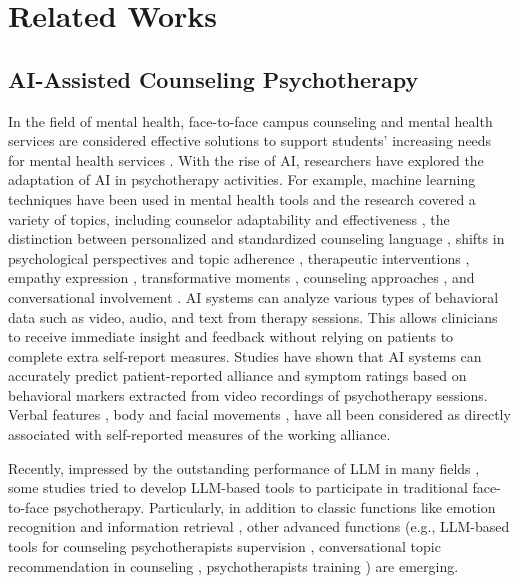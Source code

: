 \section{Related Works}
\subsection{AI-Assisted Counseling Psychotherapy}
In the field of mental health, face-to-face campus counseling and mental health services are considered effective solutions to support students' increasing needs for mental health services \citep{zabek2023roles}. With the rise of AI, researchers have explored the adaptation of AI in psychotherapy activities. For example, machine learning techniques have been used in mental health tools and the research covered a variety of topics, including counselor adaptability and effectiveness \citep{perez2019makes}, the distinction between personalized and standardized counseling language \citep{althoff2016large}, shifts in psychological perspectives and topic adherence \citep{althoff2016large,wadden2021effect}, therapeutic interventions \citep{lee2019identifying}, empathy expression \citep{sharma2020computational}, transformative moments \citep{pruksachatkun2019moments}, counseling approaches \citep{perez2022pair,shah2022modeling}, and conversational involvement \citep{sharma2020engagement}. AI systems can analyze various types of behavioral data such as video, audio, and text from therapy sessions. This allows clinicians to receive immediate insight and feedback without relying on patients to complete extra self-report measures. Studies have shown that AI systems can accurately predict patient-reported alliance and symptom ratings based on behavioral markers extracted from video recordings of psychotherapy sessions. Verbal features \citep{aafjes2020language,vail2022toward,goldberg2020machine}, body and facial movements \citep{cohen2021nonverbal}, have all been considered as directly associated with self-reported measures of the working alliance.

Recently, impressed by the outstanding performance of LLM in many fields \citep{wang2024evaluating,kung2023performance,petridis2023anglekindling}, some studies tried to develop LLM-based tools to participate in traditional face-to-face psychotherapy. Particularly, in addition to classic functions like emotion recognition \citep{muller2024recognizing} and information retrieval \citep{stade2024large}, other advanced functions (e.g., LLM-based tools for counseling psychotherapists supervision \citep{li2024automatic}, conversational topic recommendation in counseling \citep{gunal2024conversational}, psychotherapists training \citep{wang2024patient}) are emerging.

